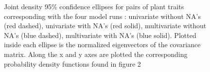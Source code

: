 \documentclass[12pt,fleqn]{article}
\begin{document}
\begin{figure}[h]
  \caption{Joint density 95\% confidence ellipses for pairs of plant traits corresponding with the four model runs : univariate without NA's (red dashed), univariate with NA's (red solid), multivariate without NA's (blue dashed), multivariate with NA's (blue solid). Plotted inside each ellipse is the normalized eigenvectors of the covariance matrix. Along the x and y axes are plotted the corresponding probability density functions found in figure 2}  \label{fig:key}
\end{figure}
\end{document}
